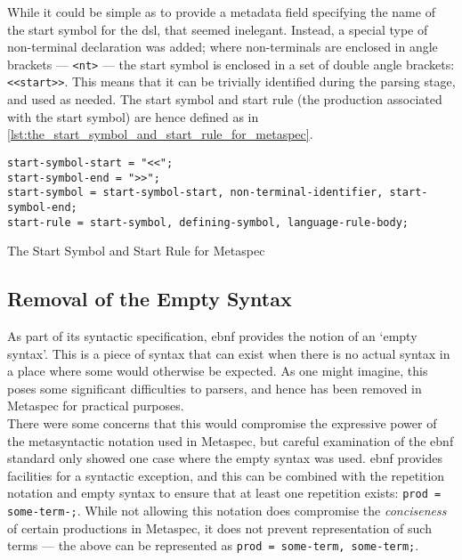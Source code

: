 While it could be simple as to provide a metadata field specifying the name of the start symbol for the \gls{dsl}, that seemed inelegant. 
Instead, a special type of non-terminal declaration was added; where non-terminals are enclosed in angle brackets --- \texttt{<nt>} --- the start symbol is enclosed in a set of double angle brackets: \texttt{<<start>>}. 
This means that it can be trivially identified during the parsing stage, and used as needed. 
The start symbol and start rule (the production associated with the start symbol) are hence defined as in \autoref{lst:the_start_symbol_and_start_rule_for_metaspec}.

\begin{listing}[!htb]
\begin{verbatim}
start-symbol-start = "<<";
start-symbol-end = ">>";
start-symbol = start-symbol-start, non-terminal-identifier, start-symbol-end;
start-rule = start-symbol, defining-symbol, language-rule-body;
\end{verbatim}
\caption{The Start Symbol and Start Rule for Metaspec}
\label{lst:the_start_symbol_and_start_rule_for_metaspec}
\end{listing}


\subsection{Removal of the Empty Syntax} %
\label{sub:removal_of_the_empty_syntax}
As part of its syntactic specification, \gls{ebnf} provides the notion of an `empty syntax'.
This is a piece of syntax that can exist when there is no actual syntax in a place where some would otherwise be expected. 
As one might imagine, this poses some significant difficulties to parsers, and hence has been removed in Metaspec for practical purposes. \\

There were some concerns that this would compromise the expressive power of the metasyntactic notation used in Metaspec, but careful examination of the \gls{ebnf} standard only showed one case where the empty syntax was used. 
\gls{ebnf} provides facilities for a syntactic exception, and this can be combined with the repetition notation and empty syntax to ensure that at least one repetition exists: \texttt{prod = {some-term}-;}.
While not allowing this notation does compromise the \textit{conciseness} of certain productions in Metaspec, it does not prevent representation of such terms --- the above can be represented as \texttt{prod = some-term, {some-term};}.

